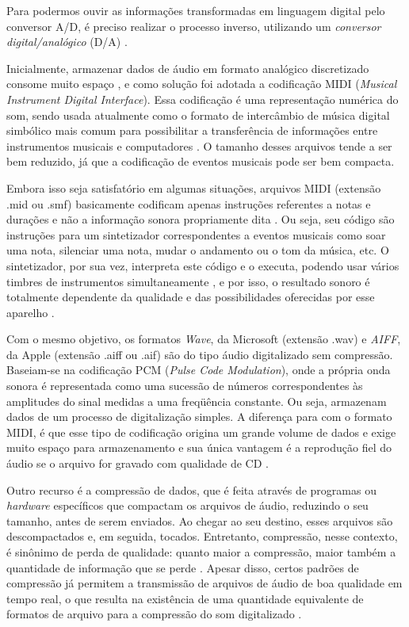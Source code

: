 Para podermos ouvir as informações transformadas em linguagem digital pelo conversor A/D, é preciso realizar o processo inverso, utilizando um \textit{conversor digital/analógico} (D/A) \cite{paulozuben2004}.

Inicialmente, armazenar dados de áudio em formato analógico discretizado consome muito espaço \cite{juliana2004}, e como solução foi adotada a codificação MIDI (\textit{Musical Instrument Digital Interface}). Essa codificação é uma representação numérica do som, sendo usada atualmente como o formato de intercâmbio de música digital simbólico mais comum para possibilitar a transferência de informações entre instrumentos musicais e computadores \cite{muller2007}. O tamanho desses arquivos tende a ser bem reduzido, já que a codificação de eventos musicais pode ser bem compacta.

Embora isso seja satisfatório em algumas situações, arquivos MIDI (extensão .mid ou .smf) basicamente codificam apenas instruções referentes a notas e durações e não a informação sonora propriamente dita \cite{fernando&kon1998}. Ou seja, seu código são instruções para um sintetizador correspondentes a eventos musicais como soar uma nota, silenciar uma nota, mudar o andamento ou o tom da música, etc. O sintetizador, por sua vez, interpreta este código e o executa, podendo usar vários timbres de instrumentos simultaneamente \cite{miletto2004}, e por isso, o resultado sonoro é totalmente dependente da qualidade e das possibilidades oferecidas por esse aparelho \cite{fernando&kon1998}.

Com o mesmo objetivo, os formatos \textit{Wave}, da Microsoft (extensão .wav) e \textit{AIFF}, da Apple (extensão .aiff ou .aif) são do tipo áudio digitalizado sem compressão. Baseiam-se na codificação PCM (\textit{Pulse Code Modulation}), onde a própria onda sonora é representada como uma sucessão de números correspondentes às amplitudes do sinal medidas a uma freqüência constante. Ou seja, armazenam dados de um processo de digitalização simples. A diferença para com o formato MIDI, é que esse tipo de codificação origina um grande volume de dados e exige muito espaço para armazenamento e sua única vantagem é a reprodução fiel do áudio se o arquivo for gravado com qualidade de CD \cite{miletto2004}.

Outro recurso é a compressão de dados, que é feita através de programas ou \textit{hardware} específicos que compactam os arquivos de áudio, reduzindo o seu tamanho, antes de serem enviados. Ao chegar ao seu destino, esses arquivos são descompactados e, em seguida, tocados. Entretanto, compressão, nesse contexto, é sinônimo de perda de qualidade: quanto maior a compressão, maior também a quantidade de informação que se perde \cite{fernando&kon1998}. Apesar disso, certos padrões de compressão já permitem a transmissão de arquivos de áudio de boa qualidade em tempo real, o que resulta na existência de uma quantidade equivalente de formatos de arquivo para a compressão do som digitalizado \cite{miletto2004}.

